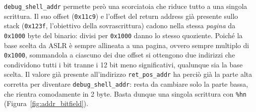 \texttt{debug\_shell\_addr} permette però una scorciatoia che riduce tutto a una singola scrittura. Il suo offset (\texttt{0x11c9}) e l'offset del return address già presente sullo stack (\texttt{0x123f}, l'obiettivo della sovrascrittura) cadono nella stessa \emph{pagina} da \texttt{0x1000} byte del binario: divisi per \texttt{0x1000} danno lo stesso quoziente. Poiché la base scelta da ASLR è sempre allineata a una pagina, ovvero sempre multiplo di \texttt{0x1000}, sommandola a ciascuno dei due offset si ottengono due indirizzi che condividono tutti i bit tranne i 12 bit meno significativi, qualunque sia la base scelta. Il valore già presente all'indirizzo \texttt{ret\_pos\_addr} ha perciò già la parte alta corretta per diventare \texttt{debug\_shell\_addr}: resta da cambiare solo la parte bassa, che rientra comodamente in 2 byte. Basta dunque una singola scrittura con \texttt{\%hn} (Figura~\ref{fig:addr_bitfield}).

